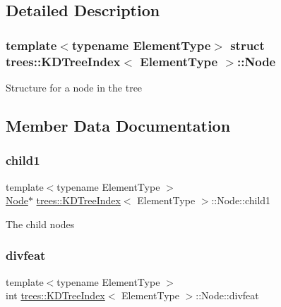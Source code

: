 \subsection{Detailed Description}
\subsubsection*{template$<$typename Element\+Type$>$\newline
struct trees\+::\+K\+D\+Tree\+Index$<$ Element\+Type $>$\+::\+Node}

Structure for a node in the tree 

\subsection{Member Data Documentation}
\mbox{\label{structtrees_1_1_k_d_tree_index_1_1_node_aa210b66e05f8a061872e46893dbb614e}} 
\subsubsection{\texorpdfstring{child1}{child1}}
{\footnotesize\ttfamily template$<$typename Element\+Type $>$ \\
\hyperlink{structtrees_1_1_k_d_tree_index_1_1_node}{Node}$\ast$ \hyperlink{classtrees_1_1_k_d_tree_index}{trees\+::\+K\+D\+Tree\+Index}$<$ Element\+Type $>$\+::Node\+::child1}

The child nodes \mbox{\label{structtrees_1_1_k_d_tree_index_1_1_node_a74e21eb4490a4c6096de83affb7a4867}} 
\subsubsection{\texorpdfstring{divfeat}{divfeat}}
{\footnotesize\ttfamily template$<$typename Element\+Type $>$ \\
int \hyperlink{classtrees_1_1_k_d_tree_index}{trees\+::\+K\+D\+Tree\+Index}$<$ Element\+Type $>$\+::Node\+::divfeat}

